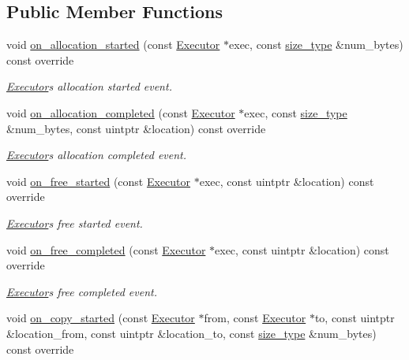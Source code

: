 \subsection*{Public Member Functions}
\begin{DoxyCompactItemize}
\item 
void \hyperlink{classgko_1_1log_1_1Stream_a0a30d9b674cfd77282d27574e32ea109}{on\+\_\+allocation\+\_\+started} (const \hyperlink{classgko_1_1Executor}{Executor} $\ast$exec, const \hyperlink{namespacegko_a6e5c95df0ae4e47aab2f604a22d98ee7}{size\+\_\+type} \&num\+\_\+bytes) const override
\begin{DoxyCompactList}\small\item\em \hyperlink{classgko_1_1Executor}{Executor}\textquotesingle{}s allocation started event. \end{DoxyCompactList}\item 
void \hyperlink{classgko_1_1log_1_1Stream_ae34836c174c73068ef26a61c6597ef86}{on\+\_\+allocation\+\_\+completed} (const \hyperlink{classgko_1_1Executor}{Executor} $\ast$exec, const \hyperlink{namespacegko_a6e5c95df0ae4e47aab2f604a22d98ee7}{size\+\_\+type} \&num\+\_\+bytes, const uintptr \&location) const override
\begin{DoxyCompactList}\small\item\em \hyperlink{classgko_1_1Executor}{Executor}\textquotesingle{}s allocation completed event. \end{DoxyCompactList}\item 
void \hyperlink{classgko_1_1log_1_1Stream_a04e460838f9c3ba72dee32b545d2caa2}{on\+\_\+free\+\_\+started} (const \hyperlink{classgko_1_1Executor}{Executor} $\ast$exec, const uintptr \&location) const override
\begin{DoxyCompactList}\small\item\em \hyperlink{classgko_1_1Executor}{Executor}\textquotesingle{}s free started event. \end{DoxyCompactList}\item 
void \hyperlink{classgko_1_1log_1_1Stream_a0b0db1ea986997ac064767656cc22c23}{on\+\_\+free\+\_\+completed} (const \hyperlink{classgko_1_1Executor}{Executor} $\ast$exec, const uintptr \&location) const override
\begin{DoxyCompactList}\small\item\em \hyperlink{classgko_1_1Executor}{Executor}\textquotesingle{}s free completed event. \end{DoxyCompactList}\item 
void \hyperlink{classgko_1_1log_1_1Stream_a7573fde6a79f715fd8b5ac7615a33b37}{on\+\_\+copy\+\_\+started} (const \hyperlink{classgko_1_1Executor}{Executor} $\ast$from, const \hyperlink{classgko_1_1Executor}{Executor} $\ast$to, const uintptr \&location\+\_\+from, const uintptr \&location\+\_\+to, const \hyperlink{namespacegko_a6e5c95df0ae4e47aab2f604a22d98ee7}{size\+\_\+type} \&num\+\_\+bytes) const override

\end{DoxyCompactItemize}
